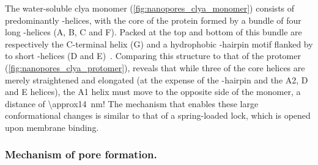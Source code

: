 The water-soluble \gls{clya} monomer (\cref{fig:nanopores_clya_monomer}) consists of predominantly
\ta-helices, with the core of the protein formed by a bundle of four long \ta-helices (\ta A, \ta B, \ta C and
\ta F). Packed at the top and bottom of this bundle are respectively the C-terminal helix (\ta G) and a
hydrophobic \tb-hairpin motif flanked by to short \ta-helices (\ta D and \ta
E)~\cite{Wallace-2000,Mueller-2009}. Comparing this structure to that of the protomer
(\cref{fig:nanopores_clya_protomer}), reveals that while three of the core helices are merely straightened and
elongated (at the expense of the \tb-hairpin and the \ta A2, \ta D and \ta E helices), the \ta A1 helix must
move to the opposite side of the monomer, a distance of \SI{\approx14}{\nm}! The mechanism that enables these
large conformational changes is similar to that of a spring-loaded lock, which is opened upon membrane
binding.

\subsubsection{Mechanism of pore formation.}
%

